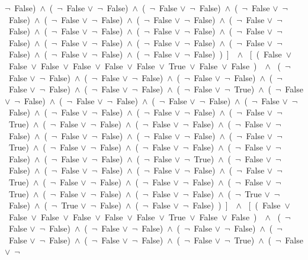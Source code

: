 ﻿\documentclass[a4paper,10pt]{article}
\begin{document}
 $\neg$\ False)\ $\wedge$\ (\  $\neg$\ False $\vee$\  $\neg$\ False)\ $\wedge$\ (\  $\neg$\ False $\vee$\  $\neg$\ False)\ $\wedge$\ (\  $\neg$\ False $\vee$\  $\neg$\ False)\ $\wedge$\ (\  $\neg$\ False $\vee$\  $\neg$\ False)\ $\wedge$\ (\  $\neg$\ False $\vee$\  $\neg$\ False)\ $\wedge$\ (\  $\neg$\ False $\vee$\  $\neg$\ False)\ $\wedge$\ (\  $\neg$\ False $\vee$\  $\neg$\ False)\ $\wedge$\ (\  $\neg$\ False $\vee$\  $\neg$\ False)\ $\wedge$\ (\  $\neg$\ False $\vee$\  $\neg$\ False)\ $\wedge$\ (\  $\neg$\ False $\vee$\  $\neg$\ False)\ $\wedge$\ (\  $\neg$\ False $\vee$\  $\neg$\ False)\ $\wedge$\ (\  $\neg$\ False $\vee$\  $\neg$\ False)\ $\wedge$\ (\  $\neg$\ False $\vee$\  $\neg$\ False)\ $\wedge$\ (\  $\neg$\ False $\vee$\  $\neg$\ False)\ )\ ]\ \ $\wedge$ \ [\ (\ False\ $\vee$\ False\ $\vee$\ False\ $\vee$\ False\ $\vee$\ False\ $\vee$\ False\ $\vee$\ True\ $\vee$\ False\ $\vee$\ False\ )\ \ $\wedge$ \ (\  $\neg$\ False $\vee$\  $\neg$\ False)\ $\wedge$\ (\  $\neg$\ False $\vee$\  $\neg$\ False)\ $\wedge$\ (\  $\neg$\ False $\vee$\  $\neg$\ False)\ $\wedge$\ (\  $\neg$\ False $\vee$\  $\neg$\ False)\ $\wedge$\ (\  $\neg$\ False $\vee$\  $\neg$\ False)\ $\wedge$\ (\  $\neg$\ False $\vee$\  $\neg$\ True)\ $\wedge$\ (\  $\neg$\ False $\vee$\  $\neg$\ False)\ $\wedge$\ (\  $\neg$\ False $\vee$\  $\neg$\ False)\ $\wedge$\ (\  $\neg$\ False $\vee$\  $\neg$\ False)\ $\wedge$\ (\  $\neg$\ False $\vee$\  $\neg$\ False)\ $\wedge$\ (\  $\neg$\ False $\vee$\  $\neg$\ False)\ $\wedge$\ (\  $\neg$\ False $\vee$\  $\neg$\ False)\ $\wedge$\ (\  $\neg$\ False $\vee$\  $\neg$\ True)\ $\wedge$\ (\  $\neg$\ False $\vee$\  $\neg$\ False)\ $\wedge$\ (\  $\neg$\ False $\vee$\  $\neg$\ False)\ $\wedge$\ (\  $\neg$\ False $\vee$\  $\neg$\ False)\ $\wedge$\ (\  $\neg$\ False $\vee$\  $\neg$\ False)\ $\wedge$\ (\  $\neg$\ False $\vee$\  $\neg$\ False)\ $\wedge$\ (\  $\neg$\ False $\vee$\  $\neg$\ True)\ $\wedge$\ (\  $\neg$\ False $\vee$\  $\neg$\ False)\ $\wedge$\ (\  $\neg$\ False $\vee$\  $\neg$\ False)\ $\wedge$\ (\  $\neg$\ False $\vee$\  $\neg$\ False)\ $\wedge$\ (\  $\neg$\ False $\vee$\  $\neg$\ False)\ $\wedge$\ (\  $\neg$\ False $\vee$\  $\neg$\ True)\ $\wedge$\ (\  $\neg$\ False $\vee$\  $\neg$\ False)\ $\wedge$\ (\  $\neg$\ False $\vee$\  $\neg$\ False)\ $\wedge$\ (\  $\neg$\ False $\vee$\  $\neg$\ False)\ $\wedge$\ (\  $\neg$\ False $\vee$\  $\neg$\ True)\ $\wedge$\ (\  $\neg$\ False $\vee$\  $\neg$\ False)\ $\wedge$\ (\  $\neg$\ False $\vee$\  $\neg$\ False)\ $\wedge$\ (\  $\neg$\ False $\vee$\  $\neg$\ True)\ $\wedge$\ (\  $\neg$\ False $\vee$\  $\neg$\ False)\ $\wedge$\ (\  $\neg$\ False $\vee$\  $\neg$\ False)\ $\wedge$\ (\  $\neg$\ True $\vee$\  $\neg$\ False)\ $\wedge$\ (\  $\neg$\ True $\vee$\  $\neg$\ False)\ $\wedge$\ (\  $\neg$\ False $\vee$\  $\neg$\ False)\ )\ ]\ \ $\wedge$ \ [\ (\ False\ $\vee$\ False\ $\vee$\ False\ $\vee$\ False\ $\vee$\ False\ $\vee$\ False\ $\vee$\ True\ $\vee$\ False\ $\vee$\ False\ )\ \ $\wedge$ \ (\  $\neg$\ False $\vee$\  $\neg$\ False)\ $\wedge$\ (\  $\neg$\ False $\vee$\  $\neg$\ False)\ $\wedge$\ (\  $\neg$\ False $\vee$\  $\neg$\ False)\ $\wedge$\ (\  $\neg$\ False $\vee$\  $\neg$\ False)\ $\wedge$\ (\  $\neg$\ False $\vee$\  $\neg$\ False)\ $\wedge$\ (\  $\neg$\ False $\vee$\  $\neg$\ True)\ $\wedge$\ (\  $\neg$\ False $\vee$\  $\neg$\ 
\end{document}
